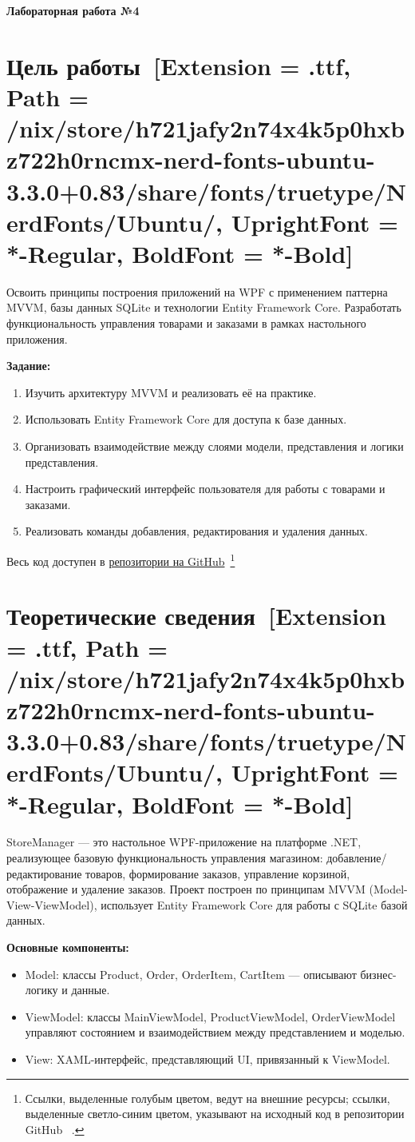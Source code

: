 \documentclass[12pt]{article}
\newcommand{\icon}[1]{\fontspec{UbuntuNerdFont}[Extension = .ttf,
  Path = /nix/store/h721jafy2n74x4k5p0hxbz722h0rncmx-nerd-fonts-ubuntu-3.3.0+0.83/share/fonts/truetype/NerdFonts/Ubuntu/,
  UprightFont = *-Regular,
BoldFont = *-Bold] #1}
\newcommand{\iicon}[1]{{\icon{#1}}}
\newcommand{\lablogo}
{
\begin{center}
    \huge{\textbf{Лабораторная работа №4}} \\
\end{center}
}
\newcommand{\colorURL}[1]{\textcolor{CtpBlue}{#1}}
\newcommand{\colorGIT}[1]{\textcolor{CtpLavender}{#1}}
\renewcommand{\texttt}[1]{{\small\ttfamily #1}}
\numberwithin{listing}{section}
\numberwithin{figure}{section}
\begin{document}
\pagestyle{empty}
\lablogo
\tableofcontents
\newpage
\listoflistings
\newpage

\pagestyle{fancy}

\section{Цель работы~\texorpdfstring{\iicon{}}{}}
Освоить принципы построения приложений на WPF с применением паттерна MVVM, базы данных SQLite и технологии Entity Framework Core. Разработать функциональность управления товарами и заказами в рамках настольного приложения.

\noindent \textbf{Задание:}
\begin{enumerate}
	\item Изучить архитектуру MVVM и реализовать её на практике.
	\item Использовать Entity Framework Core для доступа к базе данных.
	\item Организовать взаимодействие между слоями модели, представления и логики представления.
	\item Настроить графический интерфейс пользователя для работы с товарами и заказами.
	\item Реализовать команды добавления, редактирования и удаления данных.
\end{enumerate}

\noindent Весь код доступен в \colorURL{\href{https://github.com/WebMasterIT/Csharp_Labs/tree/main}{репозитории на GitHub}\ \faGithub}\footnote{Ссылки, выделенные \colorURL{голубым} цветом, ведут на внешние ресурсы; ссылки, выделенные \colorGIT{светло-синим} цветом, указывают на исходный код в репозитории GitHub \ \faGithub.}

\newpage

\section{Теоретические сведения~\texorpdfstring{\iicon{}}{}}
StoreManager — это настольное WPF-приложение на платформе .NET, реализующее базовую функциональность управления магазином: добавление/редактирование товаров, формирование заказов, управление корзиной, отображение и удаление заказов. Проект построен по принципам MVVM (Model-View-ViewModel), использует Entity Framework Core для работы с SQLite базой данных.

\noindent \textbf{Основные компоненты:}
\begin{itemize}
	\item Model: классы \texttt{Product}, \texttt{Order}, \texttt{OrderItem}, \texttt{CartItem} — описывают бизнес-логику и данные.
	\item ViewModel: классы \texttt{MainViewModel}, \texttt{ProductViewModel}, \texttt{OrderViewModel} управляют состоянием и взаимодействием между представлением и моделью.
	\item View: XAML-интерфейс, представляющий UI, привязанный к ViewModel.
\end{itemize}
\end{document}
